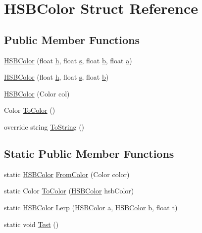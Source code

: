 \hypertarget{struct_h_s_b_color}{}\section{H\+S\+B\+Color Struct Reference}
\label{struct_h_s_b_color}
\subsection*{Public Member Functions}
\begin{DoxyCompactItemize}
\item 
\hyperlink{struct_h_s_b_color_ae2e322691d122d2c38fcf80717bf5edd}{H\+S\+B\+Color} (float \hyperlink{struct_h_s_b_color_a7379a79483a187a75bee618f6c453d35}{h}, float \hyperlink{struct_h_s_b_color_a11db1b5f23ae77f453a43a94ed1581d3}{s}, float \hyperlink{struct_h_s_b_color_ac583842adef56d674979abb714b91823}{b}, float \hyperlink{struct_h_s_b_color_a39be022c45e7139a000e5979c6a46c7a}{a})
\item 
\hyperlink{struct_h_s_b_color_a06542ddd56b2796693d26b07bfb65c08}{H\+S\+B\+Color} (float \hyperlink{struct_h_s_b_color_a7379a79483a187a75bee618f6c453d35}{h}, float \hyperlink{struct_h_s_b_color_a11db1b5f23ae77f453a43a94ed1581d3}{s}, float \hyperlink{struct_h_s_b_color_ac583842adef56d674979abb714b91823}{b})
\item 
\hyperlink{struct_h_s_b_color_a06a0ebb86c23706ee507338f7d786c6a}{H\+S\+B\+Color} (Color col)
\item 
Color \hyperlink{struct_h_s_b_color_ad6a3ec80f77b6f8d3c5fe51e292214bd}{To\+Color} ()
\item 
override string \hyperlink{struct_h_s_b_color_a799473cf4fe8473979c37c7ef0ad0154}{To\+String} ()
\end{DoxyCompactItemize}
\subsection*{Static Public Member Functions}
\begin{DoxyCompactItemize}
\item 
static \hyperlink{struct_h_s_b_color}{H\+S\+B\+Color} \hyperlink{struct_h_s_b_color_a09fe0e400c97db94d39e321e7701ec88}{From\+Color} (Color color)
\item 
static Color \hyperlink{struct_h_s_b_color_afe0e9d94cfd4813b8c0fc322e0ef12c6}{To\+Color} (\hyperlink{struct_h_s_b_color}{H\+S\+B\+Color} hsb\+Color)
\item 
static \hyperlink{struct_h_s_b_color}{H\+S\+B\+Color} \hyperlink{struct_h_s_b_color_aa2d9e2c78ad2be94d57fd2daa6eb6ab9}{Lerp} (\hyperlink{struct_h_s_b_color}{H\+S\+B\+Color} \hyperlink{struct_h_s_b_color_a39be022c45e7139a000e5979c6a46c7a}{a}, \hyperlink{struct_h_s_b_color}{H\+S\+B\+Color} \hyperlink{struct_h_s_b_color_ac583842adef56d674979abb714b91823}{b}, float t)
\item 
static void \hyperlink{struct_h_s_b_color_a143a1dc24b61dfc78017a9631284e3ce}{Test} ()
\end{DoxyCompactItemize}
